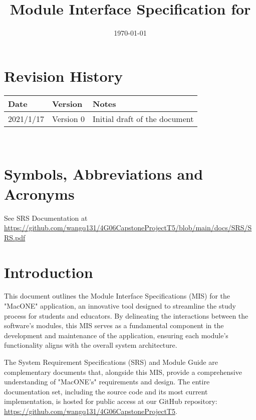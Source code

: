 \documentclass[12pt, titlepage]{article}
\begin{document}
\title{Module Interface Specification for \progname{}}

\author{\authname}

\date{\today}

\maketitle


\section{Revision History}

\begin{tabularx}{\textwidth}{p{3cm}p{2cm}X}
\toprule {\bf Date} & {\bf Version} & {\bf Notes}\\
\midrule
2021/1/17 & Version 0  & Initial draft of the document\\
\bottomrule
\end{tabularx}

~\newpage

\section{Symbols, Abbreviations and Acronyms}

See SRS Documentation at \url{https://github.com/wangq131/4G06CapstoneProjectT5/blob/main/docs/SRS/SRS.pdf}


\newpage

\tableofcontents

\newpage


\section{Introduction}
This document outlines the Module Interface Specifications (MIS) for the "MacONE" application, an innovative tool designed to streamline the study process for students and educators. By delineating the interactions between the software's modules, this MIS serves as a fundamental component in the development and maintenance of the application, ensuring each module's functionality aligns with the overall system architecture.

The System Requirement Specifications (SRS) and Module Guide are complementary documents that, alongside this MIS, provide a comprehensive understanding of "MacONE's" requirements and design. The entire documentation set, including the source code and its most current implementation, is hosted for public access at our GitHub repository: \url{https://github.com/wangq131/4G06CapstoneProjectT5}.
\end{document}
